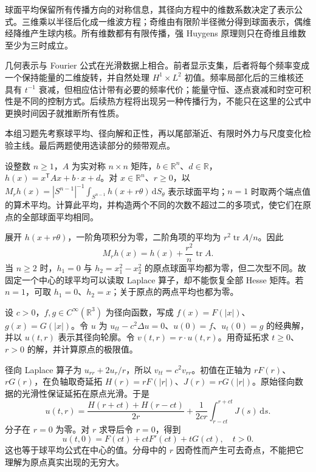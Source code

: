 \begin{chaptersummary}
球面平均保留所有传播方向的对称信息，其径向方程中的维数系数决定了表示公式。三维乘以半径后化成一维波方程；奇维由有限阶半径微分得到球面表示，偶维经降维产生球内核。所有维数都有有限传播，强 Huygens 原理则只在奇维且维数至少为三时成立。

\ProseParagraphBreak

几何表示与 Fourier 公式在光滑数据上相合。前者显示支集，后者将每个频率变成一个保持能量的二维旋转，并自然处理 \(H^1\times L^2\) 初值。频率局部化后的三维核还具有 \(t^{-1}\) 衰减，但相应估计带有必要的频率代价；能量守恒、逐点衰减和时空可积性是不同的控制方式。后续热方程将出现另一种传播行为，不能只在这里的公式中更换时间因子就推断所有性质。
\end{chaptersummary}

\BookExercises

本组习题先考察球平均、径向解和正性，再以尾部渐近、有限时外力与尺度变化检验主线。最后两题使用选读部分的频带观点。

\begin{exercise}\label{b2:ex:11-quadratic-mean}
设整数 \(n\geq1\)，\(A\) 为实对称 \(n\times n\) 矩阵，\(b\in\mathbb R^n\)、\(d\in\mathbb R\)，\(h(x)=x^{\mathsf T}Ax+b\cdot x+d\)。对 \(x\in\mathbb R^n\)、\(r\geq0\)，以 \(M_rh(x)=|S^{n-1}|^{-1}\int_{S^{n-1}}h(x+r\theta)\,\mathrm dS_\theta\) 表示球面平均；\(n=1\) 时取两个端点值的算术平均。计算此平均，并构造两个不同的次数不超过二的多项式，使它们在原点的全部球面平均相同。
\end{exercise}
\begin{solution}
展开 \(h(x+r\theta)\)，一阶角项积分为零，二阶角项的平均为 \(r^2\operatorname{tr}A/n\)。因此
\[
 M_rh(x)=h(x)+\dfrac{r^2}{n}\operatorname{tr}A.
\]
当 \(n\geq2\) 时，\(h_1=0\) 与 \(h_2=x_1^2-x_2^2\) 的原点球面平均都为零，但二次型不同。故固定一个中心的球平均可以读取 Laplace 算子，却不能恢复全部 Hesse 矩阵。若 \(n=1\)，可取 \(h_1=0\)、\(h_2=x\)；关于原点的两点平均也都为零。
\end{solution}

\begin{exercise}\label{b2:ex:11-radial-reduction}
设 \(c>0\)，\(f,g\in C^\infty(\mathbb R^3)\) 为径向函数，写成 \(f(x)=F(|x|)\)、\(g(x)=G(|x|)\)。令 \(u\) 为 \(u_{tt}-c^2\Delta u=0\)、\(u(0)=f\)、\(u_t(0)=g\) 的经典解，并以 \(u(t,r)\) 表示其径向轮廓。令 \(v(t,r)=r\cdot u(t,r)\)。用奇延拓求 \(t\geq0\)、\(r>0\) 的解，并计算原点的极限值。
\end{exercise}
\begin{solution}
径向 Laplace 算子为 \(u_{rr}+2u_r/r\)，所以 \(v_{tt}=c^2v_{rr}\)。初值在正轴为 \(rF(r)\)、\(rG(r)\)，在负轴取奇延拓 \(H(r)=rF(|r|)\)、\(J(r)=rG(|r|)\)。原始径向数据的光滑性保证延拓在原点光滑。于是
\[
 u(t,r)=\dfrac{H(r+ct)+H(r-ct)}{2r}
       +\dfrac1{2cr}\int_{r-ct}^{r+ct}J(s)\,\mathrm{d}s.
\]
分子在 \(r=0\) 为零。对 \(r\) 求导后令 \(r=0\)，得到
\[
 u(t,0)=F(ct)+ctF'(ct)+tG(ct),\quad t>0.
\]
这也等于球平均公式在中心的值。分母中的 \(r\) 因奇性而产生可去奇点，不能把它理解为原点真实出现的无穷大。
\end{solution}

